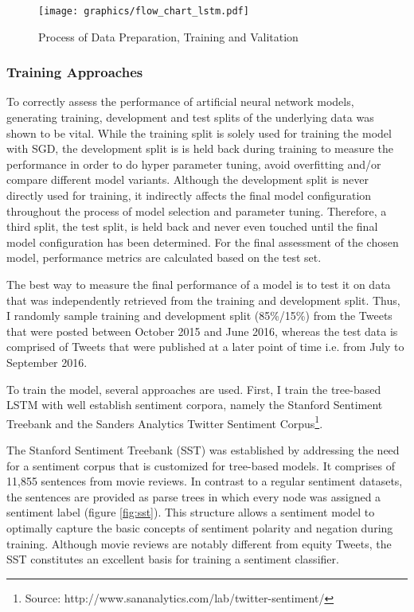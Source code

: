 \documentclass[a4paper,12pt]{article}%
\begin{document}
\begin{figure}
\captionsetup{justification=centering}
\centering
\texttt{[image: graphics/flow\_chart\_lstm.pdf]}
\caption{Process of Data Preparation, Training and Valitation \label{fig:flow_chart_lstm}}
\end{figure}

\subsubsection{Training Approaches}
To correctly assess the performance of artificial neural network models, generating training, development and test splits of the underlying data was shown to be vital. While the training split is solely used for training the model  with SGD, the development split is is held back during training to measure the performance in order to do hyper parameter tuning, avoid overfitting and/or compare different model variants. Although the development split is never directly used for training, it indirectly affects the final model configuration throughout the process of model selection and parameter tuning. Therefore, a third split, the test split, is held back and never even touched until the final model configuration has been determined. For the final assessment of the chosen model, performance metrics are calculated based on the test set.

The best way to measure the final performance of a model is to test it on data that was independently retrieved from the training and development split. Thus, I randomly sample training and development split (85\%/15\%) from the Tweets that were posted between October 2015 and June 2016, whereas the test data is comprised of Tweets that were published at a later point of time i.e. from July to September 2016.

To train the model, several approaches are used. First, I train the tree-based LSTM with well establish sentiment corpora, namely the Stanford Sentiment Treebank and the Sanders Analytics Twitter Sentiment Corpus\footnote{Source: http://www.sananalytics.com/lab/twitter-sentiment/}. 

The Stanford Sentiment Treebank (SST) was established by \citet{Socher2013} addressing the need for a sentiment corpus that is customized for tree-based models. It comprises of 11,855 sentences from movie reviews. In contrast to a regular sentiment datasets, the sentences are provided as parse trees in which every node was assigned a sentiment label (figure \ref{fig:sst}). This structure allows a sentiment model to optimally capture the basic concepts of sentiment polarity and negation during training. Although movie reviews are notably different from equity Tweets, the SST constitutes an excellent basis for training a sentiment classifier.
\end{document}
